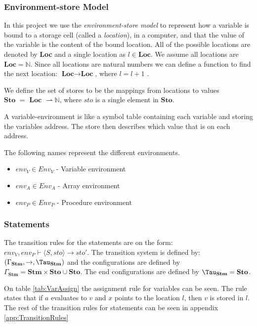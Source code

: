\subsubsection{Environment-store Model}
In this project we use the \textit{environment-store model} to represent how a variable is bound to a storage cell (called a \textit{location}), in a computer, and that the value of the variable is the content of the bound location. All of the possible locations are denoted by \textbf{Loc} and a single location as $l \in \textbf{Loc}$. We assume all locations are $\textbf{Loc} = \mathbb{N}$. Since all locations are natural numbers we can define a function to find the next location: $\textbf{Loc} \rightarrow \textbf{Loc}$, where $l = l + 1$ \citep{HHTree}. 

We define the set of stores to be the mappings from locations to values $\textbf{Sto } = \textbf{ Loc } \rightharpoonup \mathbb{N}$, where $sto$ is a single element in $\textbf{Sto}$.

A variable-environment is like a symbol table containing each variable and storing the variables address. The store then describes which value that is on each address.

The following names represent the different environments. 
\begin{itemize}
\item $env_V \in Env_V$ - Variable environment
\item $env_A \in Env_A$ - Array environment
\item $env_P \in Env_P$ - Procedure environment
\end{itemize}

\subsubsection{Statements}
The transition rules for the statements are on the form: $env_V, env_P \vdash \langle S, sto \rangle \rightarrow sto'$. The transition system is defined by: $(\Gamma_{\mathbf{Stm}}, \rightarrow, \Tau_{\mathbf{Stm}})$ and the configurations are defined by $\Gamma_{\mathbf{Stm}} = \textbf{Stm} \times \textbf{Sto} \cup \textbf{Sto}$. The end configurations are defined by $\Tau_{\mathbf{Stm}} = \textbf{Sto}$.

On table \ref{tab:VarAssign} the assignment rule for variables can be seen. The rule states that if $a$ evaluates to $v$ and $x$ points to the location $l$, then $v$ is stored in $l$. The rest of the transition rules for statements can be seen in appendix \ref{app:TransitionRules}

